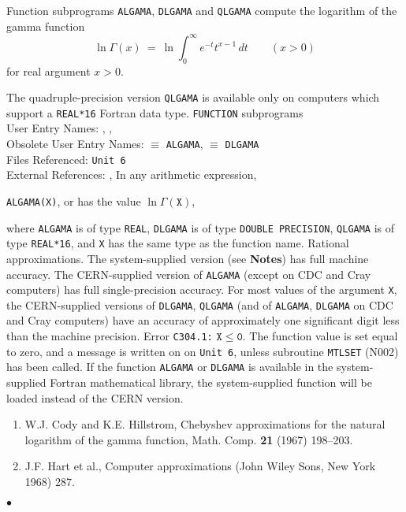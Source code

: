                             
 
\Submitter{}                             
                       
Function subprograms {\tt ALGAMA}, {\tt DLGAMA} and {\tt QLGAMA}
compute the logarithm of the gamma function
$$\displaystyle \ln \Gamma(x) \ = \
\ln \int_0^\infty e^{-t} t^{x-1}\, dt \qquad (x>0) $$
for real argument $x>0$.
\par
The quadruple-precision version {\tt QLGAMA} is available only on
computers which support a {\tt REAL*16} Fortran data type.
\Structure
{\tt FUNCTION} subprograms \\
User Entry Names: , ,   \\
Obsolete User Entry Names: \Rdef{ALOGAM} $\equiv$ {\tt ALGAMA},
 $\equiv$ {\tt DLGAMA} \\
Files Referenced: {\tt Unit 6} \\
External References: , 
\Usage
In any arithmetic expression,
\begin{center}
{\tt ALGAMA(X)},  \quad or 
\quad has the value \quad $\ln \Gamma(\mathtt{X})$,
\end{center}
where {\tt ALGAMA} is of type {\tt REAL}, {\tt DLGAMA} is of type
{\tt DOUBLE PRECISION}, {\tt QLGAMA} is of type {\tt REAL*16},
and {\tt X} has the same type as the function name.
\Method
Rational approximations.
\Accuracy
The system-supplied version (see {\bf Notes}) has full machine
accuracy.
The CERN-supplied version of {\tt ALGAMA} (except on CDC and Cray
computers) has full single-precision accuracy.
For most values of the argument {\tt X},
the CERN-supplied versions of {\tt DLGAMA}, {\tt QLGAMA}
(and of {\tt ALGAMA}, {\tt DLGAMA}
on CDC and Cray computers) have an accuracy of approximately one
significant digit less than the machine precision.
\Errorh
Error {\tt C304.1:}  $\mathtt{X \le 0}$.
The function value is set equal to zero, and a message is written on
on {\tt Unit 6}, unless subroutine {\tt MTLSET} (N002) has been called.
\Notes
If the function {\tt ALGAMA} or {\tt DLGAMA} is available in the
system-supplied Fortran mathematical library, the system-supplied
function will be loaded instead of the CERN version.
\Refer
\begin{enumerate}
\item  W.J. Cody and K.E. Hillstrom, Chebyshev approximations
for the natural logarithm of the gamma function,
Math. Comp. {\bf 21} (1967) 198--203.
\item  J.F. Hart et al., Computer approximations (John Wiley
 Sons, New York 1968) 287.
\end{enumerate}
$\bullet$
